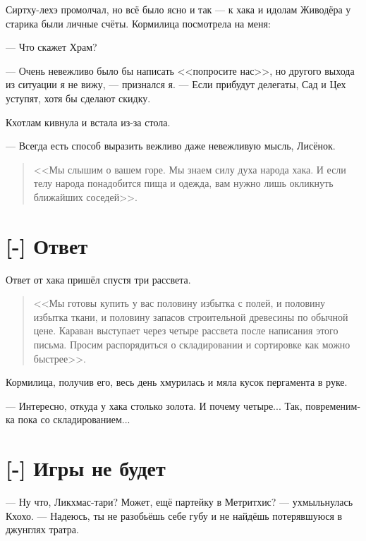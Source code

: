 Сиртху-лехэ промолчал, но всё было ясно и так --- к хака и идолам Живодёра у старика были личные счёты.
Кормилица посмотрела на меня:

--- Что скажет Храм?

--- Очень невежливо было бы написать <<попросите нас>>, но другого выхода из ситуации я не вижу, --- признался я.
--- Если прибудут делегаты, Сад и Цех уступят, хотя бы сделают скидку.

Кхотлам кивнула и встала из-за стола.

--- Всегда есть способ выразить вежливо даже невежливую мысль, Лисёнок.

\begin{quote}
<<Мы слышим о вашем горе.
Мы знаем силу духа народа хака.
И если телу народа понадобится пища и одежда, вам нужно лишь окликнуть ближайших соседей>>.
\end{quote}

\section{[-] Ответ}

\textspace

Ответ от хака пришёл спустя три рассвета.

\begin{quote}
<<Мы готовы купить у вас половину избытка с полей, и половину избытка ткани, и половину запасов строительной древесины по обычной цене.
Караван выступает через четыре рассвета после написания этого письма.
Просим распорядиться о складировании и сортировке как можно быстрее>>.
\end{quote}

Кормилица, получив его, весь день хмурилась и мяла кусок пергамента в руке.

--- Интересно, откуда у хака столько золота.
И почему четыре...
Так, повременим-ка пока со складированием...

\section{[-] Игры не будет}

\textspace

--- Ну что, Ликхмас-тари? Может, ещё партейку в Метритхис? --- ухмыльнулась Кхохо.
--- Надеюсь, ты не разобьёшь себе губу и не найдёшь потерявшуюся в джунглях тратра\FM.

